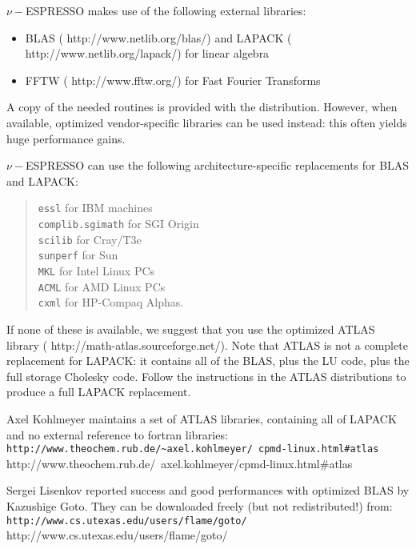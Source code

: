 \documentclass[12pt,a4paper]{article}
\begin{document}
$\nu-$ESPRESSO makes use of the following external libraries:
\begin{itemize}
  \item BLAS
        (%
                           {http://www.netlib.org/blas/})
        and LAPACK\hfill\break
        (%
                           {http://www.netlib.org/lapack/})
        for linear algebra
  \item FFTW
        (%
                           {http://www.fftw.org/})
        for Fast Fourier Transforms
\end{itemize}
A copy of the needed routines is provided with the distribution.
However, when available, optimized vendor-specific libraries can be
used instead: this often yields huge performance gains.

$\nu-$ESPRESSO can use the following architecture-specific replacements for
BLAS and LAPACK:
\begin{quote}
  \texttt{essl} for IBM machines\\
  \texttt{complib.sgimath} for SGI Origin\\
  \texttt{scilib} for Cray/T3e\\
  \texttt{sunperf} for Sun\\
  \texttt{MKL} for Intel Linux PCs\\
  \texttt{ACML} for AMD Linux PCs\\
  \texttt{cxml} for HP-Compaq Alphas.
\end{quote}
If none of these is available, we suggest that you use the optimized
ATLAS library
(%
                   {http://math-atlas.sourceforge.net/}).
Note that ATLAS is not a complete replacement for LAPACK: it contains
all of the BLAS, plus the LU code, plus the full storage Cholesky
code.  Follow the instructions in the ATLAS distributions to produce a
full LAPACK replacement.

Axel Kohlmeyer maintains a set of ATLAS libraries, 
containing all of LAPACK and no external reference to fortran
libraries:\hfill\break
\htmladdnormallink%
{{\small\texttt{http://www.theochem.rub.de/\~{}axel.kohlmeyer/%
                cpmd-linux.html\#atlas}}}%
{http://www.theochem.rub.de/~axel.kohlmeyer/cpmd-linux.html\#atlas}

Sergei Lisenkov reported success and good performances with
optimized BLAS by Kazushige Goto.
They can be downloaded freely (but not redistributed!) from:
\htmladdnormallink%
{\texttt{http://www.cs.utexas.edu/users/flame/goto/}}%
{http://www.cs.utexas.edu/users/flame/goto/}
\end{document}
